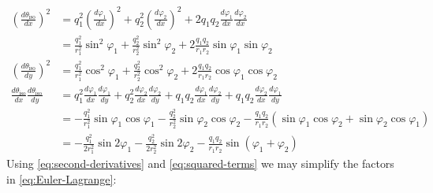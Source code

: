\documentclass[reqno]{article}
\begin{document}
\begin{equation} \label{eq:squared-terms}
    \begin{split}
        \left(\frac{d \theta_\text{iso}}{dx}\right)^2
        &=
        q_1^2 \left(\frac{d \varphi_1}{dx} \right)^2
        + q_2^2 \left(\frac{d \varphi_2}{dx} \right)^2
        + 2 q_1 q_2\frac{d \varphi_1}{dx} \frac{d \varphi_2}{dx} \\
        &= 
        \frac{q_1^2}{r_1^2} \sin^2 \varphi_1
        + \frac{q_2^2}{r_2^2} \sin^2 \varphi_2
        + 2 \frac{q_1 q_2}{r_1 r_2} \sin \varphi_1 \sin \varphi_2 \\
        \left(\frac{d \theta_\text{iso}}{dy}\right)^2
        &= 
        \frac{q_1^2}{r_1^2} \cos^2 \varphi_1
        + \frac{q_2^2}{r_2^2} \cos^2 \varphi_2
        + 2 \frac{q_1 q_2}{r_1 r_2} \cos \varphi_1 \cos \varphi_2 \\
        \frac{d \theta_\text{iso}}{dx} \frac{d \theta_\text{iso}}{dy}
        &=
        q_1^2 \frac{d \varphi_1}{d x}\frac{d \varphi_1}{d y}
        + q_2^2 \frac{d \varphi_2}{d x}\frac{d \varphi_2}{d y}
        + q_1 q_2 \frac{d \varphi_1}{d x}\frac{d \varphi_2}{d y}
        + q_1 q_2 \frac{d \varphi_2}{d x}\frac{d \varphi_1}{d y} \\
        &=
        - \frac{q_1^2}{r_1^2} \sin\varphi_1 \cos\varphi_1
        - \frac{q_2^2}{r_2^2} \sin\varphi_2 \cos\varphi_2
        - \frac{q_1 q_2}{r_1 r_2} \left(\sin\varphi_1 \cos\varphi_2 + \sin\varphi_2 \cos\varphi_1 \right)\\
        &=
        - \frac{q_1^2}{2 r_1^2} \sin 2\varphi_1
        - \frac{q_2^2}{2 r_2^2} \sin 2\varphi_2
        - \frac{q_1 q_2}{r_1 r_2} \sin\left(\varphi_1 + \varphi_2\right)
    \end{split}
\end{equation}
Using \eqref{eq:second-derivatives} and \eqref{eq:squared-terms} we may simplify the factors in \eqref{eq:Euler-Lagrange}:
\end{document}
